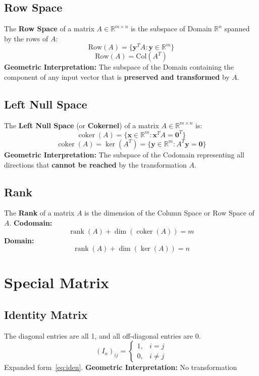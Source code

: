 \documentclass{article}
\begin{document}
\subsection{Row Space}
The \textbf{Row Space} of a matrix $A \in \mathbb{R}^{m \times n}$ is the subspace of Domain $\mathbb{R}^n$ spanned by the rows of $A$:
\[
    \text{Row}(A) = \{ \mathbf{y}^T A : \mathbf{y} \in \mathbb{R}^m \}
\]
\[
    \text{Row}(A) = \text{Col}(A^T)
\]
\textbf{Geometric Interpretation:} The subspace of the Domain containing the component of any input vector that is \textbf{preserved and transformed} by $A$.

\subsection{Left Null Space}
The \textbf{Left Null Space} (or \textbf{Cokernel}) of a matrix $A \in \mathbb{R}^{m \times n}$ is:
\[
    \operatorname{coker}(A) = \{ \mathbf{x} \in \mathbb{R}^m : \mathbf{x}^T A = \mathbf{0}^T \}
\]
\[
    \operatorname{coker}(A) = \ker(A^T) = \{ \mathbf{y} \in \mathbb{R}^m : A^T \mathbf{y} = \mathbf{0} \}
\]
\textbf{Geometric Interpretation:} The subspace of the Codomain representing all directions that \textbf{cannot be reached} by the transformation $A$.

\subsection{Rank}
The \textbf{Rank} of a matrix $A$ is the dimension of the Column Space or Row Space of $A$.
\newline
\textbf{Codomain:}
\[
    \operatorname{rank}(A) + \dim(\operatorname{coker}(A)) = m
\]
\textbf{Domain:}
\[
    \operatorname{rank}(A) + \dim(\ker(A)) = n
\]


\newpage
\section{Special Matrix}

\subsection{Identity Matrix}
The diagonal entries are all 1, and all off-diagonal entries are 0.
\[
    (I_n)_{ij} =
    \begin{cases}
        1, & i = j \\
        0, & i \neq j
    \end{cases}
\]
Expanded form~\ref{eq:iden}.
\newline
\textbf{Geometric Interpretation:} No transformation
\end{document}
